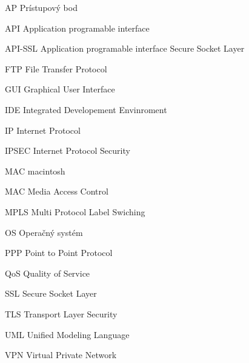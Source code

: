 \begin{seznamzkratek}{90}
	
		{AP}								%
		{Prístupový bod}	
	
		{API}								%
		{Application programable interface}
	
	
		{API-SSL}								%
		{Application programable interface Secure Socket Layer}	
	
		{FTP}								%
		{File Transfer Protocol}		
	
		{GUI}								%
		{Graphical User Interface}	
	
		{IDE}								%
		{Integrated Developement Envinroment}		
	
		{IP}								%
		{Internet Protocol}	
	
		{IPSEC}								%
		{Internet Protocol Security}
	
		{MAC}								%
		{macintosh}
		
		{MAC}								%
		{Media Access Control}	
	
		{MPLS}								%
		{Multi Protocol Label Swiching}		
	
		{OS}								%
		{Operačný systém}		
	
		{PPP}								%
		{Point to Point Protocol}		
	
		{QoS}								%
		{Quality of Service}		
	
		{SSL}								%
		{Secure Socket Layer}
	
		{TLS}								%
		{Transport Layer Security}	
	
		{UML}								%
		{Unified Modeling Language}
	
		{VPN}								%
		{Virtual Private Network}	
												
\end{seznamzkratek}
